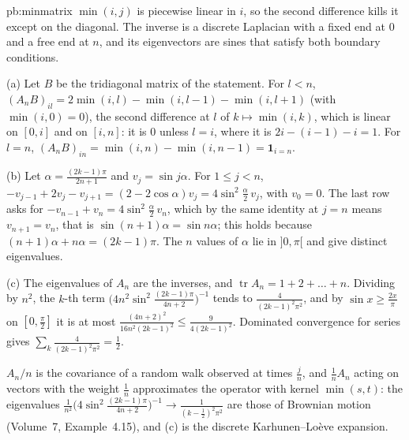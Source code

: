 \begin{solution}{pb:minmatrix}
\idea $\min(i,j)$ is piecewise linear in $i$, so the second difference kills it except on the diagonal. The inverse is a discrete Laplacian with a fixed end at $0$ and a free end at $n$, and its
eigenvectors are sines that satisfy both boundary conditions.

\writeup (a) Let $B$ be the tridiagonal matrix of the statement. For $l<n$, $(A_nB)_{il}=2\min(i,l)-\min(i,l-1)-\min(i,l+1)$ (with $\min(i,0)=0$), the second difference at $l$ of $k\mapsto\min(i,k)$,
which is linear on $[0,i]$ and on $[i,n]$: it is $0$ unless $l=i$, where it is $2i-(i-1)-i=1$. For $l=n$, $(A_nB)_{in}=\min(i,n)-\min(i,n-1)=\mathbf 1_{i=n}$.

(b) Let $\alpha=\frac{(2k-1)\pi}{2n+1}$ and $v_j=\sin j\alpha$. For $1\le j<n$, $-v_{j-1}+2v_j-v_{j+1}=(2-2\cos\alpha)v_j=4\sin^2\frac\alpha2\,v_j$, with $v_0=0$. The last row asks for
$-v_{n-1}+v_n=4\sin^2\frac\alpha2\,v_n$, which by the same identity at $j=n$ means $v_{n+1}=v_n$, that is $\sin(n+1)\alpha=\sin n\alpha$; this holds because $(n+1)\alpha+n\alpha=(2k-1)\pi$. The $n$ values of
$\alpha$ lie in $]0,\pi[$ and give distinct eigenvalues.

(c) The eigenvalues of $A_n$ are the inverses, and $\operatorname{tr}A_n=1+2+\dots+n$. Dividing by $n^2$, the $k$-th term $\bigl(4n^2\sin^2\frac{(2k-1)\pi}{4n+2}\bigr)^{-1}$ tends to $\frac4{(2k-1)^2\pi^2}$, and by
$\sin x\ge\frac{2x}\pi$ on $[0,\frac\pi2]$ it is at most $\frac{(4n+2)^2}{16n^2(2k-1)^2}\le\frac9{4(2k-1)^2}$. Dominated convergence for series gives $\sum_k\frac4{(2k-1)^2\pi^2}=\frac12$.

\leads $A_n/n$ is the covariance of a random walk observed at times $\frac jn$, and $\frac1nA_n$ acting on vectors with the weight $\frac1n$ approximates the operator with kernel $\min(s,t)$: the eigenvalues
$\frac1{n^2}\bigl(4\sin^2\frac{(2k-1)\pi}{4n+2}\bigr)^{-1}\to\frac1{(k-\frac12)^2\pi^2}$ are those of Brownian motion (Volume~7, Example~4.15), and (c) is the discrete Karhunen--Loève expansion.
\end{solution}

